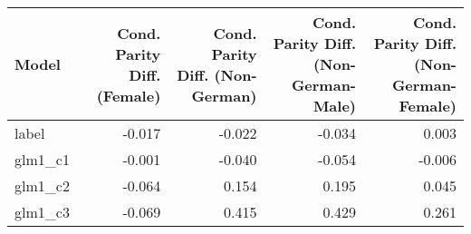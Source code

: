 \begin{tabular}{lrrrr}
\toprule
Model & Cond. Parity Diff. (Female) & Cond. Parity Diff. (Non-German) & Cond. Parity Diff. (Non-German-Male) & Cond. Parity Diff. (Non-German-Female) \\
\midrule
label & -0.017 & -0.022 & -0.034 & 0.003 \\
glm1_c1 & -0.001 & -0.040 & -0.054 & -0.006 \\
glm1_c2 & -0.064 & 0.154 & 0.195 & 0.045 \\
glm1_c3 & -0.069 & 0.415 & 0.429 & 0.261 \\
\bottomrule
\end{tabular}
